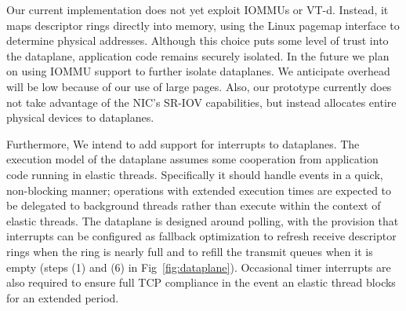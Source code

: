 \begin{comment}
  \myparagraph{Using interrupts as a fallback:} Some applications
  service requests that require extended intervals of compute time. We
  intend for these requests to be delegated to from elastic threads to
  background threads in order to ensure that elastic threads remain
  responsive.  However, \ix can also be modified to better tolerate
  unanticipated delays during application processing in elastic
  threads.  One option would be to use interrupts as a fallback
  mode. On the receive side, the NIC would fire an interrupt whenever
  the recieve descriptor ring is almost full. The dataplane could then
  move packets from the receive ring to a software structure, averting
  buffer underrun. On the transmit side, NIC would fire an interrupt
  whenever the transmit ring becomes empty so that it can be
  refilled. Such an interrupt would only need to be armed when there
  is additional transmit data pending. A desirable property of this
  approach is that neither interrupt would be triggered as long as
  elastic threads are sufficiently responsive, but if an elastic
  thread misbehaves, the \ix dataplane would be able to regain control
  and catch up on network processing.
\end{comment}


 Our current
implementation does not yet exploit IOMMUs or VT-d. Instead, it maps
descriptor rings directly into \ix memory, using the Linux pagemap
interface to determine physical addresses.  Although this choice puts
some level of trust into the \ix dataplane, application code remains
securely isolated. In the future we plan on using IOMMU support to
further isolate \ix dataplanes. We anticipate overhead will be low
because of our use of large pages.
Also, our prototype currently does not take advantage of the NIC's SR-IOV capabilities, but instead allocates entire physical devices to dataplanes.

Furthermore, We intend to add support for interrupts to \ix dataplanes. The
execution model of the \ix dataplane assumes some cooperation from
application code running in elastic threads.  Specifically it should
handle events in a quick, non-blocking manner; operations with
extended execution times are expected to be delegated to background
threads rather than execute within the context of elastic threads.
The \ix dataplane is designed around polling, with the provision that
interrupts can be configured as fallback optimization to refresh
receive descriptor rings when the ring is nearly full and to refill
the transmit queues when it is empty (steps (1) and (6) in
Fig~\ref{fig:dataplane}). Occasional timer interrupts are also
required to ensure full TCP compliance in the event an elastic thread
blocks for an extended period.


